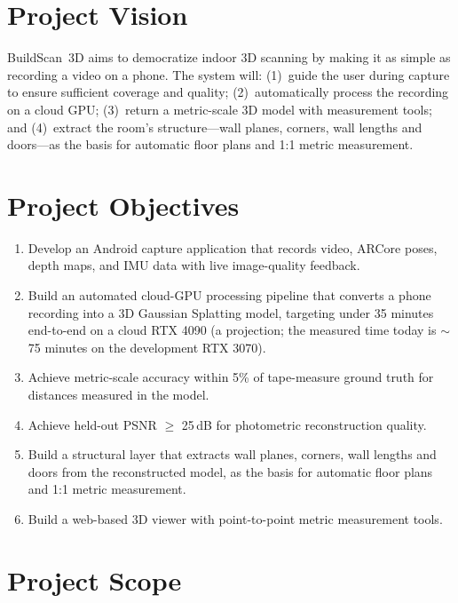 \section{Project Vision}
BuildScan~3D aims to democratize indoor 3D scanning by making it as simple as recording a video on a phone. The system will: (1)~guide the user during capture to ensure sufficient coverage and quality; (2)~automatically process the recording on a cloud GPU; (3)~return a metric-scale 3D model with measurement tools; and (4)~extract the room's structure---wall planes, corners, wall lengths and doors---as the basis for automatic floor plans and 1:1 metric measurement.

\section{Project Objectives}
\begin{enumerate}
    \item Develop an Android capture application that records video, ARCore poses, depth maps, and IMU data with live image-quality feedback.
    \item Build an automated cloud-GPU processing pipeline that converts a phone recording into a 3D Gaussian Splatting model, targeting under 35 minutes end-to-end on a cloud RTX 4090 (a projection; the measured time today is $\sim$75 minutes on the development RTX 3070).
    \item Achieve metric-scale accuracy within 5\% of tape-measure ground truth for distances measured in the model.
    \item Achieve held-out PSNR $\geq$ 25\,dB for photometric reconstruction quality.
    \item Build a structural layer that extracts wall planes, corners, wall lengths and doors from the reconstructed model, as the basis for automatic floor plans and 1:1 metric measurement.
    \item Build a web-based 3D viewer with point-to-point metric measurement tools.
\end{enumerate}

\section{Project Scope}

